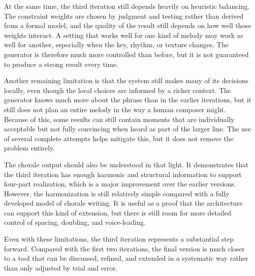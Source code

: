 At the same time, the third iteration still depends heavily on heuristic balancing. The constraint weights are chosen by judgment and testing rather than derived from a formal model, and the quality of the result still depends on how well those weights interact. A setting that works well for one kind of melody may work as well for another, especially when the key, rhythm, or texture changes. The generator is therefore much more controlled than before, but it is not guaranteed to produce a strong result every time.

Another remaining limitation is that the system still makes many of its decisions locally, even though the local choices are informed by a richer context. The generator knows much more about the phrase than in the earlier iterations, but it still does not plan an entire melody in the way a human composer might. Because of this, some results can still contain moments that are individually acceptable but not fully convincing when heard as part of the larger line. The use of several complete attempts helps mitigate this, but it does not remove the problem entirely.

The chorale output should also be understood in that light. It demonstrates that the third iteration has enough harmonic and structural information to support four-part realization, which is a major improvement over the earlier versions. However, the harmonization is still relatively simple compared with a fully developed model of chorale writing. It is useful as a proof that the architecture can support this kind of extension, but there is still room for more detailed control of spacing, doubling, and voice-leading.

Even with these limitations, the third iteration represents a substantial step forward. Compared with the first two iterations, the final version is much closer to a tool that can be discussed, refined, and extended in a systematic way rather than only adjusted by trial and error.
